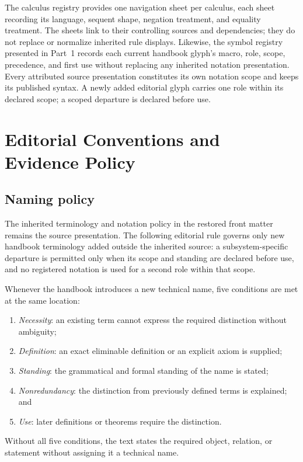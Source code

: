 The calculus registry provides one navigation sheet per calculus, each sheet
recording its language, sequent shape, negation treatment, and equality
treatment.  The sheets link to their controlling sources and dependencies;
they do not replace or normalize inherited rule displays.
Likewise, the symbol registry presented in Part~1 records each current
handbook glyph's macro, role, scope, precedence, and first use without
replacing any inherited notation presentation.  Every attributed source
presentation constitutes its own notation scope and keeps its published
syntax.  A newly added editorial glyph carries one role within its declared
scope; a scoped departure is declared before use.

\chapter*{Editorial Conventions and Evidence Policy}

\section*{Naming policy}

The inherited terminology and notation policy in the restored front matter
remains the source presentation.  The following editorial rule governs only new
handbook terminology added outside the inherited source: a subsystem-specific
departure is permitted only when its scope and standing are declared before
use, and no registered notation is used for a second role within that scope.

Whenever the handbook introduces a new technical name, five conditions are
met at the same location:
\begin{enumerate}
  \item \emph{Necessity}: an existing term cannot express the required
        distinction without ambiguity;
  \item \emph{Definition}: an exact eliminable definition or an explicit
        axiom is supplied;
  \item \emph{Standing}: the grammatical and formal standing of the name is
        stated;
  \item \emph{Nonredundancy}: the distinction from previously defined terms
        is explained; and
  \item \emph{Use}: later definitions or theorems require the distinction.
\end{enumerate}
Without all five conditions, the text states the required object, relation, or
statement without assigning it a technical name.
